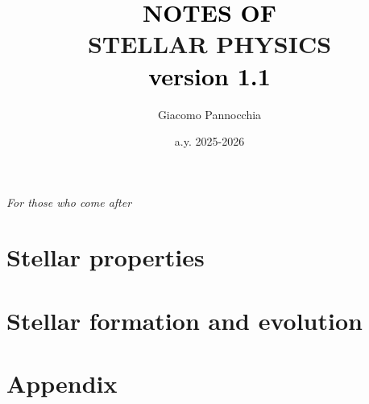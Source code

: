 \documentclass[a4paper,twoside,openright,titlepage,
               headinclude,footinclude,BCOR5mm,
               numbers=noenddot,cleardoublepage=empty,
               tablecaptionabove]{scrbook}
\author{Giacomo Pannocchia}
\title{\textcolor{black}{NOTES OF}\\ \textcolor{RawSienna}{STELLAR PHYSICS} \\ \vspace{7pt}\large \quad \quad \quad \quad \quad \textcolor{black}{version 1.1}}
\date{a.y. 2025-2026}
\begin{document}
  \begin{titlepage}
    \maketitle
  \end{titlepage}

\cleardoublepage
\newpage

\pagestyle{empty}

\thispagestyle{empty}
    \null{}
        \begin{flushright}
          \Large
                \emph{For those who come after}
        
        \end{flushright}
\null

\cleardoublepage
\newpage

\pagestyle{empty}
\setcounter{page}{1}

% 



\cleardoublepage
\newpage

\tableofcontents
\cleardoublepage
\newpage

\mainmatter
\pagestyle{scrheadings}

\setcounter{page}{1}

\part{Stellar properties}




\part{Stellar formation and evolution}

%
%

\part{Appendix}


\cleardoublepage
{}


\cleardoublepage
{}
{}
\small


\end{document}
